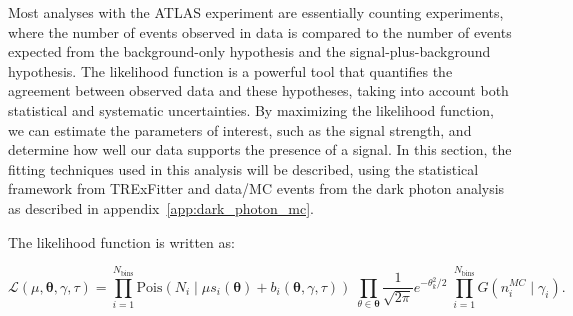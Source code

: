 Most analyses with the ATLAS experiment are essentially counting experiments, where the number of events observed in data is compared to the number of events expected from the background-only hypothesis and the signal-plus-background hypothesis. 
The likelihood function is a powerful tool that quantifies the agreement between observed data and these hypotheses, taking into account both statistical and systematic uncertainties. 
By maximizing the likelihood function, we can estimate the parameters of interest, such as the signal strength, and determine how well our data supports the presence of a signal. 
In this section, the fitting techniques used in this analysis will be described, using the statistical framework from TRExFitter and data/MC events from the dark photon analysis as described in appendix~\ref{app:dark_photon_mc}.

The likelihood function is written as:

\begin{equation}\label{eq:likelihood}
\mathcal{L}(\mu,\boldsymbol{\theta}, \gamma, \tau)
=
\prod_{i=1}^{N_{\text{bins}}}
\mathrm{Pois}\!\left(N_i \mid \mu s_i(\boldsymbol{\theta}) +b_i(\boldsymbol{\theta},\gamma,\tau)\right)
\;
\prod_{\theta\in\boldsymbol{\theta}}
\frac{1}{\sqrt{2\pi}}e^{-\theta_k^2/2}
\;
\prod_{i=1}^{N_{\text{bins}}}
G\!\left(n^{MC}_i \mid \gamma_i\right).
\end{equation}

